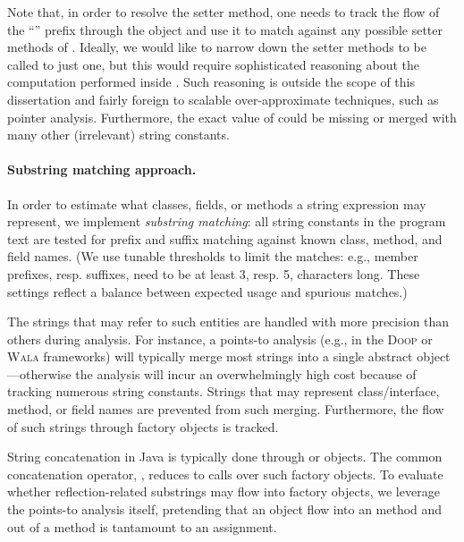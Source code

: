 Note that, in order to resolve the setter method, one needs to track
the flow of the ``'' prefix through the
 object and use it to match against any possible
setter methods of .
%
Ideally, we would like to narrow down the setter methods to be called
to just one, but this would require sophisticated reasoning about the
computation performed inside . Such
reasoning is outside the scope of this dissertation and fairly foreign
to scalable over-approximate techniques, such as pointer
analysis. Furthermore, the exact value of  could be
missing or merged with many other (irrelevant) string constants.


\paragraph{Substring matching approach.}
In order to estimate what classes, fields, or methods a string
expression may represent, we implement \emph{substring matching}: all
string constants in the program text are tested for prefix and suffix
matching against known class, method, and field names. (We use
tunable thresholds to limit the matches: e.g., member prefixes,
resp. suffixes, need to be at least 3, resp. 5, characters long.
These settings reflect a balance between expected usage and spurious
matches.)

The strings that may refer to such entities are handled with more
precision than others during analysis. For instance, a points-to
analysis (e.g., in the \textsc{Doop} or \textsc{Wala} frameworks) will
typically merge most strings into a single abstract object---otherwise
the analysis will incur an overwhelmingly high cost because of tracking numerous
string constants. Strings that may represent class/interface, method,
or field names are prevented from such merging. Furthermore, the flow
of such strings through factory objects is tracked.

String concatenation in Java is typically done through
 or  objects. The
common concatenation operator, \code{+}, reduces to calls over such
factory objects. To evaluate whether reflection-related substrings may
flow into factory objects, we leverage the points-to analysis itself,
pretending that an object flow into an  method and out of
a  method is tantamount to an assignment.

